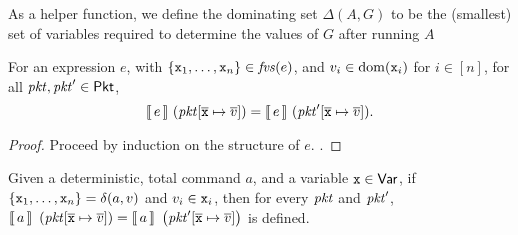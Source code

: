 
As a helper function, we define the dominating set $\Delta(A,G)$ to be
the (smallest) set of variables required to determine the values of $G$
after running $A$

\begin{lemma}
  \label{lem:def-fvs-expr}
  For an expression $e$, with
  $\{\texttt{x}_1, \ldots, \texttt{x}_n\} \in \mathit{fvs}(e)$, and
  $v_i \in \mathrm{dom}(\texttt{x}_i)$ for $i \in [n]$, for all
  $\mathit{pkt}, \mathit{pkt}' \in \mathsf{Pkt}$,
  \[\llbracket\,e\,\rrbracket~(\mathit{pkt}[\overline{\texttt{x}} \mapsto \overline{v}]) =
  \llbracket\,e\,\rrbracket~(\mathit{pkt}'[\overline{\texttt{x}} \mapsto \overline{v}]).\]
\end{lemma}

\begin{proof}
  Proceed by induction on the structure of $e$.  .
\end{proof}

\begin{lemma}
  \label{lem:delta-dom}
  Given a deterministic, total command $a$, and a variable
  $\texttt{x} \in \mathsf{Var}$, if
  $\{\texttt{x}_1, \ldots, \texttt{x}_n\} = \delta(a,v)$ and
  $v_i \in \texttt{x}_i$, then for every $\mathit{pkt}$ and $\mathit{pkt}'$,
  $\llbracket\,a\,\rrbracket~\left(\mathit{pkt}[\overline{\texttt{x}} \mapsto \overline{v}]\right)
  = \llbracket\,a\,\rrbracket~\left(\mathit{pkt}'[\overline{\texttt{x}} \mapsto \overline{v}]\right)$
  is defined.
\end{lemma}

